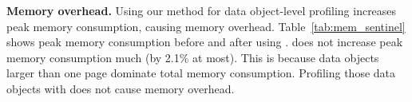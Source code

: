 \textcolor{check}{\textbf{Memory overhead.}
Using our method for data object-level profiling increases peak memory consumption, causing memory overhead. Table~\ref{tab:mem_sentinel} shows peak memory consumption before and after using \name. \name does not increase peak memory consumption much (by 2.1\% at most). This is because data objects larger than one page dominate total memory consumption. Profiling those data objects with \name does not cause memory overhead.}


